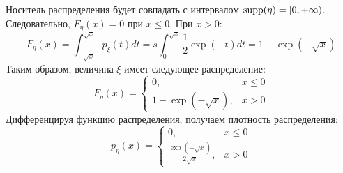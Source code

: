 \begin{enumerate}
	Носитель распределения будет совпадать с интервалом $\operatorname{supp} (\eta) = [0, +\infty)$. Следовательно, $F_{\eta}(x) = 0$ при $x \le 0$. При $x>0$:
	\[ F_{\eta} (x) = \int_{-\sqrt{x}}^{\sqrt{x}} p_{\xi} (t)dt = s \int_{0}^{\sqrt{x}} \frac{1}{2} \exp (-t)dt = 1 - \exp (- \sqrt{x}) \]
	Таким образом, величина $\xi$ имеет следующее распределение:
	\[
	F_{\eta}(x) =
	\begin{cases}
		0, &x \le 0 \\
		1 - \exp (-\sqrt{x}), &x > 0
	\end{cases}
	\]
	Дифференцируя функцию распределения, получаем плотность распределения:
	\[
	p_{\eta}(x) =
	\begin{cases}
		0, &x \le 0 \\
		\frac{\exp (- \sqrt{x})}{2\sqrt{x}}, &x > 0
	\end{cases}
	\]
\end{enumerate}

 